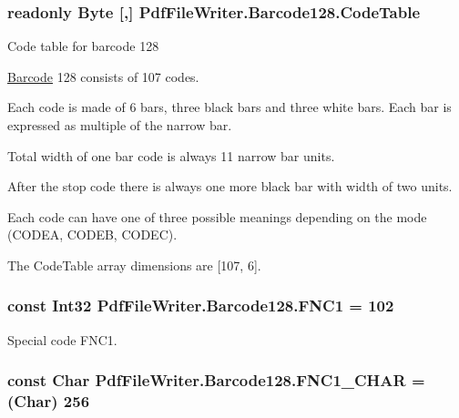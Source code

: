 \subsubsection[{\texorpdfstring{Code\+Table}{CodeTable}}]{\setlength{\rightskip}{0pt plus 5cm}readonly Byte \mbox{[},\mbox{]} Pdf\+File\+Writer.\+Barcode128.\+Code\+Table\hspace{0.3cm}{\ttfamily [static]}}\hypertarget{class_pdf_file_writer_1_1_barcode128_a81c19f70c45b1fa1dbeafba18820e0c4}{}\label{class_pdf_file_writer_1_1_barcode128_a81c19f70c45b1fa1dbeafba18820e0c4}


Code table for barcode 128 

\hyperlink{class_pdf_file_writer_1_1_barcode}{Barcode} 128 consists of 107 codes. 

Each code is made of 6 bars, three black bars and three white bars. Each bar is expressed as multiple of the narrow bar. 

Total width of one bar code is always 11 narrow bar units. 

After the stop code there is always one more black bar with width of two units. 

Each code can have one of three possible meanings depending on the mode (C\+O\+D\+EA, C\+O\+D\+EB, C\+O\+D\+EC). 

The Code\+Table array dimensions are \mbox{[}107, 6\mbox{]}. 
\subsubsection[{\texorpdfstring{F\+N\+C1}{FNC1}}]{\setlength{\rightskip}{0pt plus 5cm}const Int32 Pdf\+File\+Writer.\+Barcode128.\+F\+N\+C1 = 102}\hypertarget{class_pdf_file_writer_1_1_barcode128_a776c9658f90e61a977cb06bb7bcf80f9}{}\label{class_pdf_file_writer_1_1_barcode128_a776c9658f90e61a977cb06bb7bcf80f9}


Special code F\+N\+C1. 

\subsubsection[{\texorpdfstring{F\+N\+C1\+\_\+\+C\+H\+AR}{FNC1_CHAR}}]{\setlength{\rightskip}{0pt plus 5cm}const Char Pdf\+File\+Writer.\+Barcode128.\+F\+N\+C1\+\_\+\+C\+H\+AR = (Char) 256}\hypertarget{class_pdf_file_writer_1_1_barcode128_afd9b16f97cc3a1044cab639947c74610}{}\label{class_pdf_file_writer_1_1_barcode128_afd9b16f97cc3a1044cab639947c74610}


